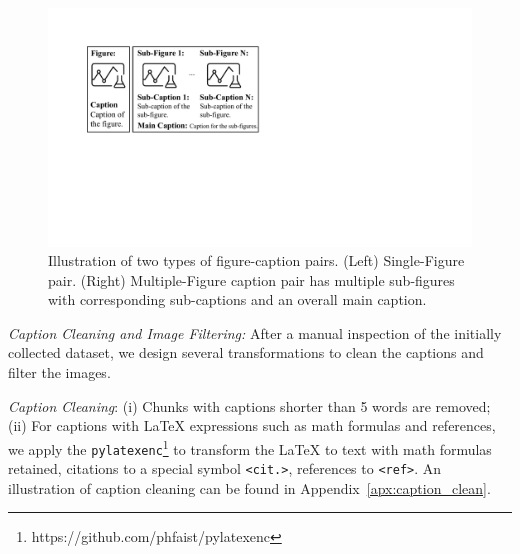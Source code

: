 \begin{figure}[t!]
    \centering
    \includegraphics[width=0.9\linewidth]{figs/chunk-v2.pdf}
    \caption{Illustration of two types of figure-caption pairs. (Left) Single-Figure pair. (Right) Multiple-Figure caption pair has multiple sub-figures with corresponding sub-captions and an overall main caption. }
    \label{fig:chunk_example}
\end{figure}



\noindent\emph{Caption Cleaning and Image Filtering:}
After a manual inspection of the initially collected dataset, we design several transformations to clean the captions and filter the images.

\noindent\emph{Caption Cleaning}: (i) Chunks with captions shorter than 5 words are removed; (ii) For captions with LaTeX expressions such as math formulas and references, we apply the \texttt{pylatexenc}\footnote{https://github.com/phfaist/pylatexenc} to transform the LaTeX to text with math formulas retained, citations to a special symbol \texttt{<cit.>}, references to \texttt{<ref>}. An illustration of caption cleaning can be found in Appendix~\ref{apx:caption_clean}.



